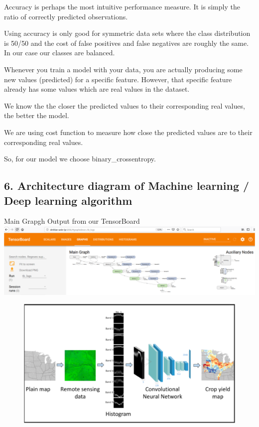 \documentclass[11pt]{article}
\makeatletter
\def\maxwidth{\ifdim\Gin@nat@width>\linewidth\linewidth
    \else\Gin@nat@width\fi}
\let\Oldincludegraphics\includegraphics
\renewcommand{\includegraphics}[1]{\Oldincludegraphics[width=.8\maxwidth]{#1}}
\makeatother
\begin{document}
Accuracy is perhaps the most intuitive performance measure. It is simply
the ratio of correctly predicted observations.

Using accuracy is only good for symmetric data sets where the class
distribution is 50/50 and the cost of false positives and false
negatives are roughly the same. In our case our classes are balanced.

Whenever you train a model with your data, you are actually producing
some new values (predicted) for a specific feature. However, that
specific feature already has some values which are real values in the
dataset.

We know the the closer the predicted values to their corresponding real
values, the better the model.

We are using cost function to measure how close the predicted values are
to their corresponding real values.

So, for our model we choose binary\_crossentropy.

    \subsection{6. Architecture diagram of Machine learning / Deep learning
algorithm}\label{architecture-diagram-of-machine-learning-deep-learning-algorithm}

Main Grapgh Output from our TensorBoard \includegraphics{main_graph.png}

\begin{figure}
\centering
\includegraphics{analysis.png}
\caption{}
\end{figure}
\end{document}
